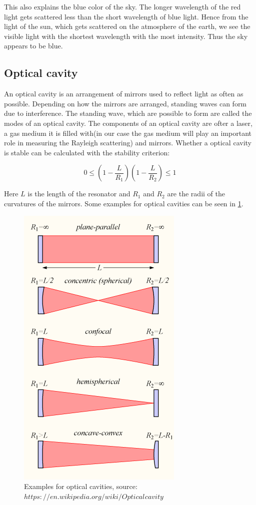 \documentclass[12pt,a4paper]{article}
\begin{document}
This also explains the blue color of the sky. The longer wavelength of the red light gets scattered less than the short wavelength of blue light. Hence from the light of the sun, which gets scattered on the atmosphere of the earth, we see the visible light with the shortest wavelength with the most intensity. Thus the sky appears to be blue.

\subsection{Optical cavity}

An optical cavity is an arrangement of mirrors used to reflect light as often as possible. Depending on how the mirrors are arranged, standing waves can form due to interference. The standing wave, which are possible to form are called the modes of an optical cavity. The components of an optical cavity are ofter a laser, a gas medium it is filled with(in our case the gas medium will play an important role in measuring the Rayleigh scattering) and mirrors. Whether a optical cavity is stable can be calculated with the stability criterion:

\begin{equation}
	0 \leq (1 -  \frac{L}{R_1})(1- \frac{L}{R_2}) \leq 1
\end{equation}

Here $L$ is the length of the resonator and $R_1$ and $R_2$ are the radii of the curvatures of the mirrors. Some examples for optical cavities can be seen in \ref{optical_cavities}.

\begin{figure}[h]
	\includegraphics[scale = 0.5]{Optical-cavity1.png}
	\centering
	\caption{Examples for optical cavities, source: \href{https://en.wikipedia.org/wiki/Optical_cavity}{$https://en.wikipedia.org/wiki/Optical_{}cavity$}}
	\label{optical_cavities}
\end{figure}
\end{document}
